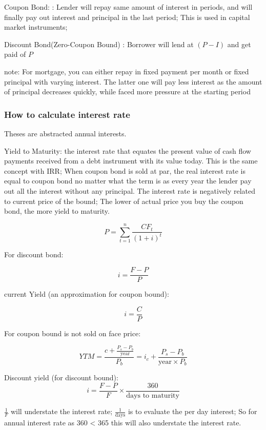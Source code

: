 \documentclass[10pt, a4paper]{article}
\begin{document}
        \quad Coupon Bond: : Lender will repay same amount of interest in periods, and will finally pay out interest and principal in the last period; This is used in capital market instruments;

        \quad Discount Bond(Zero-Coupon Bound) : Borrower will lend at $(P - I)$ and get paid of $P$  

        note: For mortgage, you can either repay in fixed payment per month or fixed principal with varying interest. The latter one will pay less interest as the amount of principal decreases quickly, while faced more pressure at the starting period

        \subsubsection{How to calculate interest rate}

            Theses are abstracted annual interests.

            Yield to  Maturity: the interest rate that equates the present value of cash flow payments received from a debt instrument with its value today. This is the same concept with IRR; When coupon bond is sold at par, the real interest rate is equal to coupon bond no matter what the term is as every year the lender pay out all the interest without any principal. The interest rate is negatively related to current price of the bound; The lower of actual price you buy the coupon bond, the more yield to maturity.  

            $$P = \sum_{t = 1}^{n}\frac{CF_t}{(1 + i)^t}$$

            For discount bond: 

            $$i = \frac{F - P}{P}$$

            \medskip
            
            current Yield (an approximation for coupon bound):

            $$i = \frac{C}{P}$$

            For coupon bound is not sold on face price:

            $$YTM =  \frac{c + \frac{P_s - P_b}{\text{year}}}{P_b} = i_c + \frac{P_s - P_b}{\text{year}\times P_b}$$

            Discount yield (for discount bound):
            $$i = \frac{F - P}{F} \times \frac{360}{\text{days to maturity}}$$

            $\frac{1}{F}$ will understate the interest rate; $\frac{1}{\text{days}}$ is to evaluate the per day interest; So for annual interest rate as 360 < 365 this will also understate the interest rate. 
\end{document}
